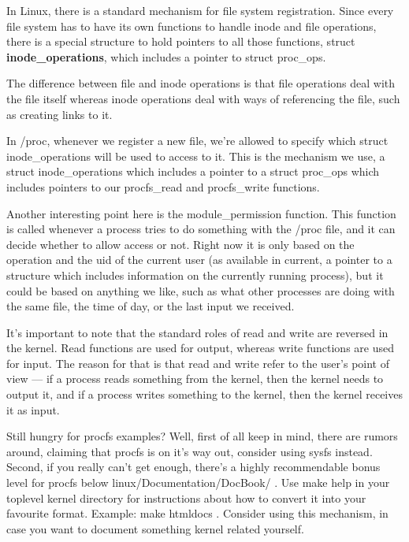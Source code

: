 \documentclass[10pt, oneside]{book}
\begin{document}
In Linux, there is a standard mechanism for file system registration. Since every file system has to have its own functions to handle inode and file operations, there is a special structure to hold pointers to all those functions, struct \textbf{inode\_operations}, which includes a pointer to struct proc\_ops.

The difference between file and inode operations is that file operations deal with the file itself whereas inode operations deal with ways of referencing the file, such as creating links to it.

In /proc, whenever we register a new file, we're allowed to specify which struct inode\_operations will be used to access to it. This is the mechanism we use, a struct inode\_operations which includes a pointer to a struct proc\_ops which includes pointers to our procfs\_read and procfs\_write functions.

Another interesting point here is the module\_permission function. This function is called whenever a process tries to do something with the /proc file, and it can decide whether to allow access or not. Right now it is only based on the operation and the uid of the current user (as available in current, a pointer to a structure which includes information on the currently running process), but it could be based on anything we like, such as what other processes are doing with the same file, the time of day, or the last input we received.

It's important to note that the standard roles of read and write are reversed in the kernel. Read functions are used for output, whereas write functions are used for input. The reason for that is that read and write refer to the user's point of view --- if a process reads something from the kernel, then the kernel needs to output it, and if a process writes something to the kernel, then the kernel receives it as input.


Still hungry for procfs examples? Well, first of all keep in mind, there are rumors around, claiming that procfs is on it's way out, consider using sysfs instead. Second, if you really can't get enough, there's a highly recommendable bonus level for procfs below linux/Documentation/DocBook/ . Use make help in your toplevel kernel directory for instructions about how to convert it into your favourite format. Example: make htmldocs . Consider using this mechanism, in case you want to document something kernel related yourself.
\end{document}
